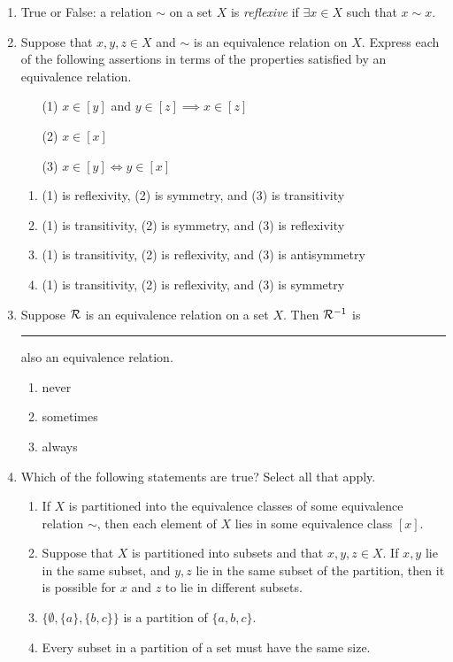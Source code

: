 \pagestyle{empty}


\begin{enumerate}
	\item True or False: a relation $\sim$ on a set $X$ is \emph{reflexive} if $\exists x\in X$ such that $x\sim x$.


	\item Suppose that $x,y,z\in X$ and $\sim$ is an equivalence relation on $X$. Express each of the following assertions in terms of the properties satisfied by an equivalence relation.
  \begin{itemize}
    \item[(1)] $x\in[y]$ and $y\in[z]\implies x\in[z]$
    \item[(2)] $x\in[x]$
    \item[(3)] $x\in[y]\iff y\in[x]$
  \end{itemize}
  \begin{enumerate}
  	 \item (1) is reflexivity, (2) is symmetry, and (3) is transitivity
  	 \item (1) is transitivity, (2) is symmetry, and (3) is reflexivity
  	 \item (1) is transitivity, (2) is reflexivity, and (3) is antisymmetry
  	 \item (1) is transitivity, (2) is reflexivity, and (3) is symmetry
 	\end{enumerate}
  	
  	
	\item Suppose $\mathcal{R}$ is an equivalence relation on a set $X$. Then $\mathcal{R}^{-1}$ is \rule{2cm}{0.15mm} also an equivalence relation.
	\begin{enumerate}
    \item never
    \item sometimes
    \item always
	\end{enumerate}


	\item Which of the following statements are true? Select all that apply.
	\begin{enumerate}
    \item If $X$ is partitioned into the equivalence classes of some equivalence relation $\sim$, then each element of $X$ lies in some equivalence class $[x]$.
    \item Suppose that $X$ is partitioned into subsets and that $x,y,z\in X$. If $x,y$ lie in the same subset, and $y,z$ lie in the same subset of the partition, then it is possible for $x$ and $z$ to lie in different subsets.
    \item $\bigl\{\emptyset, \{a\}, \{b,c\}\bigr\}$ is a partition of $\{a,b,c\}$.
    \item Every subset in a partition of a set must have the same size.
	\end{enumerate}



\end{enumerate}
